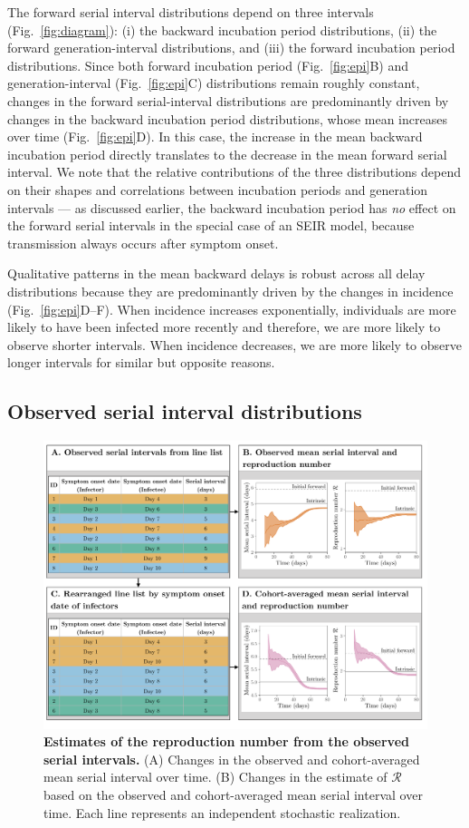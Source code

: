 \documentclass[12pt]{article}
\newcommand{\fref}[1]{Fig.~\ref{fig:#1}}
\newcommand{\RR}{\ensuremath{{\mathcal R}}\xspace}
\begin{document}
The forward serial interval distributions depend on three intervals (\fref{diagram}): (i) the backward incubation period distributions, (ii) the forward generation-interval distributions, and (iii) the forward incubation period distributions.
Since both forward incubation period (\fref{epi}B) and generation-interval (\fref{epi}C) distributions remain roughly constant, changes in the forward serial-interval distributions are predominantly driven by changes in the backward incubation period distributions, whose mean increases over time (\fref{epi}D). 
In this case, the increase in the mean backward incubation period directly translates to the decrease in the mean forward serial interval.
We note that the relative contributions of the three distributions depend on their shapes and correlations between incubation periods and generation intervals --- as discussed earlier, the backward incubation period has \emph{no} effect on the forward serial intervals in the special case of an SEIR model, because transmission always occurs after symptom onset.

Qualitative patterns in the mean backward delays is robust across all delay distributions because they are predominantly driven by the changes in incidence (\fref{epi}D--F).
When incidence increases exponentially, individuals are more likely to have been infected more recently and therefore, we are more likely to observe shorter intervals.
When incidence decreases, we are more likely to observe longer intervals for similar but opposite reasons.

\subsection{Observed serial interval distributions}

\begin{figure}[!ht]
\includegraphics[width=\textwidth]{diagram.pdf}
\caption{
\textbf{Estimates of the reproduction number from the observed serial intervals.}
(A) Changes in the observed and cohort-averaged mean serial interval over time.
(B) Changes in the estimate of \RR based on the observed and cohort-averaged mean serial interval over time.
Each line represents an independent stochastic realization.
}
\label{fig:obsrR}
\end{figure}
\end{document}
